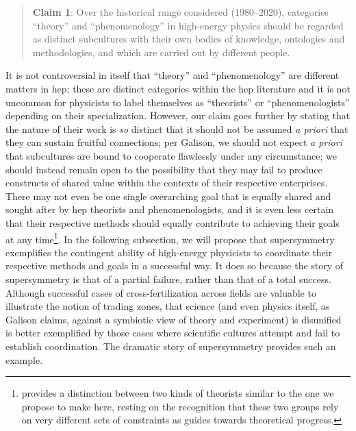 \documentclass[smallextended]{svjour3}
\begin{document}
\begin{quote}
    \textbf{Claim 1}: Over the historical range considered (1980--2020), categories ``theory'' and ``phenomenology'' in high-energy physics should be regarded as distinct subcultures with their own bodies of knowledge, ontologies and methodologies, and which are carried out by different people.
\end{quote}

 It is not controversial in itself that ``theory'' and ``phenomenology'' are different matters in \gls{hep}; these are distinct categories within the \gls{hep} literature and it is not uncommon for physicists to label themselves as ``theorists'' or ``phenomenologists'' depending on their specialization. However, our claim goes further by stating that the nature of their work is \textit{so} distinct that it should not be assumed \textit{a priori} that they can sustain fruitful connections; per Galison, we should not expect \textit{a priori} that subcultures are bound to cooperate flawlessly under any circumstance; we should instead remain open to the possibility that they may fail to produce constructs of shared value within the contexts of their respective enterprises. There may not even be one single overarching goal that is equally shared and sought after by \gls{hep} theorists and phenomenologists, and it is even less certain that their respective methods should equally contribute to achieving their goals at any time\footnote{\citealt{Galison1995} provides a distinction between two kinds of theorists similar to the one we propose to make here, resting on the recognition that these two groups rely on very different sets of constraints as guides towards theoretical progress.}. In the following subsection, we will propose that supersymmetry exemplifies the contingent ability of high-energy physicists to coordinate their respective methods and goals in a successful way. It does so because the story of supersymmetry is that of a partial failure, rather than that of a total success. Although successful cases of cross-fertilization across fields are valuable to illustrate the notion of trading zones, that science (and even physics itself, as Galison claims, against a symbiotic view of theory and experiment) is disunified is better exemplified by those cases where scientific cultures attempt and fail to establish coordination. The dramatic story of supersymmetry provides such an example.

\end{document}
